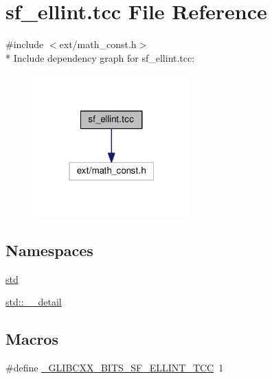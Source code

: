 \hypertarget{sf__ellint_8tcc}{}\section{sf\+\_\+ellint.\+tcc File Reference}
\label{sf__ellint_8tcc}
{\ttfamily \#include $<$ext/math\+\_\+const.\+h$>$}\\*
Include dependency graph for sf\+\_\+ellint.\+tcc\+:\nopagebreak
\begin{figure}[H]
\begin{center}
\leavevmode
\includegraphics[width=172pt]{sf__ellint_8tcc__incl}
\end{center}
\end{figure}
\subsection*{Namespaces}
\begin{DoxyCompactItemize}
\item 
 \hyperlink{namespacestd}{std}
\item 
 \hyperlink{namespacestd_1_1____detail}{std\+::\+\_\+\+\_\+detail}
\end{DoxyCompactItemize}
\subsection*{Macros}
\begin{DoxyCompactItemize}
\item 
\#define \hyperlink{sf__ellint_8tcc_a4b6f21b1d48bfb7a988fe3346437ccce}{\+\_\+\+G\+L\+I\+B\+C\+X\+X\+\_\+\+B\+I\+T\+S\+\_\+\+S\+F\+\_\+\+E\+L\+L\+I\+N\+T\+\_\+\+T\+C\+C}~1
\end{DoxyCompactItemize}
